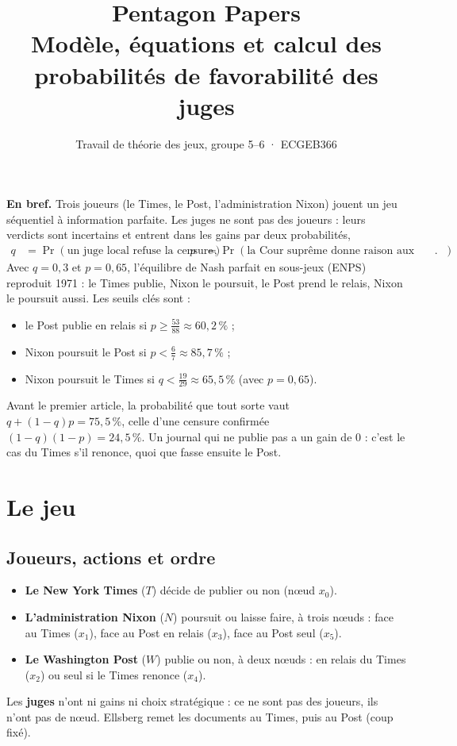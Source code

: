 \documentclass[11pt,a4paper]{article}
\title{\textbf{Pentagon Papers}\\[3pt]\large Modèle, équations et calcul des probabilités de favorabilité des juges}
\author{Travail de théorie des jeux, groupe 5--6 · ECGEB366}
\date{}
\theoremstyle{definition}
\begin{document}
\maketitle
\vspace{-1.2cm}

\begin{resultat}
\textbf{En bref.} Trois joueurs (le Times, le Post, l'administration Nixon) jouent un jeu séquentiel à information parfaite. Les juges ne sont pas des joueurs : leurs verdicts sont incertains et entrent dans les gains par deux probabilités,
\begin{align*}
q&=\Pr(\text{un juge local refuse la censure}), & p&=\Pr(\text{la Cour suprême donne raison aux journaux}).
\end{align*}
Avec $q=0,3$ et $p=0,65$, l'équilibre de Nash parfait en sous-jeux (ENPS) reproduit 1971 : le Times publie, Nixon le poursuit, le Post prend le relais, Nixon le poursuit aussi. Les seuils clés sont :
\begin{itemize}[leftmargin=*,itemsep=0pt,topsep=2pt]
\item le Post publie en relais si $p\ge\frac{53}{88}\approx60,2\,\%$ ;
\item Nixon poursuit le Post si $p<\frac67\approx85,7\,\%$ ;
\item Nixon poursuit le Times si $q<\frac{19}{29}\approx65,5\,\%$ (avec $p=0,65$).
\end{itemize}
Avant le premier article, la probabilité que tout sorte vaut $q+(1-q)p=75,5\,\%$, celle d'une censure confirmée $(1-q)(1-p)=24,5\,\%$. Un journal qui ne publie pas a un gain de $0$ : c'est le cas du Times s'il renonce, quoi que fasse ensuite le Post.
\end{resultat}

\section{Le jeu}

\subsection{Joueurs, actions et ordre}
\begin{itemize}[leftmargin=*,itemsep=1pt]
\item \textbf{Le New York Times} ($T$) décide de publier ou non (nœud $x_0$).
\item \textbf{L'administration Nixon} ($N$) poursuit ou laisse faire, à trois nœuds : face au Times ($x_1$), face au Post en relais ($x_3$), face au Post seul ($x_5$).
\item \textbf{Le Washington Post} ($W$) publie ou non, à deux nœuds : en relais du Times ($x_2$) ou seul si le Times renonce ($x_4$).
\end{itemize}
Les \textbf{juges} n'ont ni gains ni choix stratégique : ce ne sont pas des joueurs, ils n'ont pas de nœud. Ellsberg remet les documents au Times, puis au Post (coup fixé).
\end{document}
